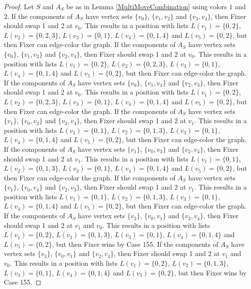 \documentclass[12pt]{amsart}
\theoremstyle{plain}
\theoremstyle{definition}
\theoremstyle{remark}
\begin{document}
\begin{proof}
Let $S$ and $A_S$ be as in Lemma \ref{MultiMoveCombination} using colors $1$ and $2$. If the components of $A_S$ have vertex sets $\{v_0\}$, $\{v_1, v_2\}$ and $\{v_3, v_4\}$, then Fixer should swap 1 and 2 at $v_0$. This results in a position with lists $L(v_1) = \{0, 2\}$, $L(v_2) = \{0, 2, 3\}$, $L(v_3) = \{0, 1\}$, $L(v_4) = \{0, 1, 4\}$ and $L(v_5) = \{0, 2\}$, but then Fixer can edge-color the graph.
If the components of $A_S$ have vertex sets $\{v_0\}$, $\{v_1, v_3\}$ and $\{v_2, v_4\}$, then Fixer should swap 1 and 2 at $v_0$. This results in a position with lists $L(v_1) = \{0, 2\}$, $L(v_2) = \{0, 2, 3\}$, $L(v_3) = \{0, 1\}$, $L(v_4) = \{0, 1, 4\}$ and $L(v_5) = \{0, 2\}$, but then Fixer can edge-color the graph.
If the components of $A_S$ have vertex sets $\{v_0\}$, $\{v_1, v_4\}$ and $\{v_2, v_3\}$, then Fixer should swap 1 and 2 at $v_0$. This results in a position with lists $L(v_1) = \{0, 2\}$, $L(v_2) = \{0, 2, 3\}$, $L(v_3) = \{0, 1\}$, $L(v_4) = \{0, 1, 4\}$ and $L(v_5) = \{0, 2\}$, but then Fixer can edge-color the graph.
If the components of $A_S$ have vertex sets $\{v_1\}$, $\{v_0, v_2\}$ and $\{v_3, v_4\}$, then Fixer should swap 1 and 2 at $v_1$. This results in a position with lists $L(v_1) = \{0, 1\}$, $L(v_2) = \{0, 1, 3\}$, $L(v_3) = \{0, 1\}$, $L(v_4) = \{0, 1, 4\}$ and $L(v_5) = \{0, 2\}$, but then Fixer can edge-color the graph.
If the components of $A_S$ have vertex sets $\{v_1\}$, $\{v_0, v_3\}$ and $\{v_2, v_4\}$, then Fixer should swap 1 and 2 at $v_1$. This results in a position with lists $L(v_1) = \{0, 1\}$, $L(v_2) = \{0, 1, 3\}$, $L(v_3) = \{0, 1\}$, $L(v_4) = \{0, 1, 4\}$ and $L(v_5) = \{0, 2\}$, but then Fixer can edge-color the graph.
If the components of $A_S$ have vertex sets $\{v_1\}$, $\{v_0, v_4\}$ and $\{v_2, v_3\}$, then Fixer should swap 1 and 2 at $v_1$. This results in a position with lists $L(v_1) = \{0, 1\}$, $L(v_2) = \{0, 1, 3\}$, $L(v_3) = \{0, 1\}$, $L(v_4) = \{0, 1, 4\}$ and $L(v_5) = \{0, 2\}$, but then Fixer can edge-color the graph.
If the components of $A_S$ have vertex sets $\{v_2\}$, $\{v_0, v_1\}$ and $\{v_3, v_4\}$, then Fixer should swap 1 and 2 at $v_1$ and $v_0$. This results in a position with lists $L(v_1) = \{0, 2\}$, $L(v_2) = \{0, 1, 3\}$, $L(v_3) = \{0, 1\}$, $L(v_4) = \{0, 1, 4\}$ and $L(v_5) = \{0, 2\}$, but then Fixer wins by Case 155.
If the components of $A_S$ have vertex sets $\{v_3\}$, $\{v_0, v_1\}$ and $\{v_2, v_4\}$, then Fixer should swap 1 and 2 at $v_1$ and $v_0$. This results in a position with lists $L(v_1) = \{0, 2\}$, $L(v_2) = \{0, 1, 3\}$, $L(v_3) = \{0, 1\}$, $L(v_4) = \{0, 1, 4\}$ and $L(v_5) = \{0, 2\}$, but then Fixer wins by Case 155.

\end{proof}
\end{document}
